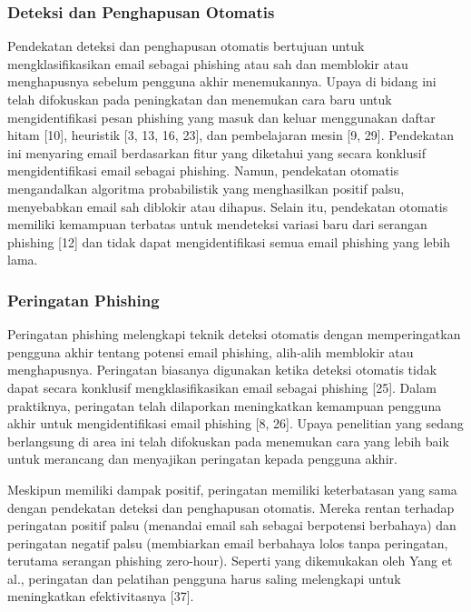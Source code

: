 \documentclass[lettersize,journal]{IEEEtran}
\begin{document}
\subsubsection{Deteksi dan Penghapusan Otomatis}
Pendekatan deteksi dan penghapusan otomatis bertujuan untuk mengklasifikasikan
email sebagai phishing atau sah dan memblokir atau menghapusnya sebelum
pengguna akhir menemukannya. Upaya di bidang ini telah difokuskan pada
peningkatan dan menemukan cara baru untuk mengidentifikasi pesan phishing yang
masuk dan keluar menggunakan daftar hitam [10], heuristik [3, 13, 16, 23], dan
pembelajaran mesin [9, 29]. Pendekatan ini menyaring email berdasarkan fitur
yang diketahui yang secara konklusif mengidentifikasi email sebagai phishing.
Namun, pendekatan otomatis mengandalkan algoritma probabilistik yang
menghasilkan positif palsu, menyebabkan email sah diblokir atau dihapus. Selain
itu, pendekatan otomatis memiliki kemampuan terbatas untuk mendeteksi variasi
baru dari serangan phishing [12] dan tidak dapat mengidentifikasi semua email
phishing yang lebih lama.

\subsubsection{Peringatan Phishing}
Peringatan phishing melengkapi teknik deteksi otomatis dengan memperingatkan
pengguna akhir tentang potensi email phishing, alih-alih memblokir atau
menghapusnya. Peringatan biasanya digunakan ketika deteksi otomatis tidak dapat
secara konklusif mengklasifikasikan email sebagai phishing [25]. Dalam
praktiknya, peringatan telah dilaporkan meningkatkan kemampuan pengguna akhir
untuk mengidentifikasi email phishing [8, 26]. Upaya penelitian yang sedang
berlangsung di area ini telah difokuskan pada menemukan cara yang lebih baik
untuk merancang dan menyajikan peringatan kepada pengguna akhir.

Meskipun memiliki dampak positif, peringatan memiliki keterbatasan yang sama
dengan pendekatan deteksi dan penghapusan otomatis. Mereka rentan terhadap
peringatan positif palsu (menandai email sah sebagai berpotensi berbahaya) dan peringatan negatif
palsu (membiarkan email berbahaya lolos tanpa peringatan, terutama serangan
phishing zero-hour). Seperti yang dikemukakan oleh Yang et al., peringatan dan
pelatihan pengguna harus saling melengkapi untuk meningkatkan efektivitasnya
  [37].
\end{document}
